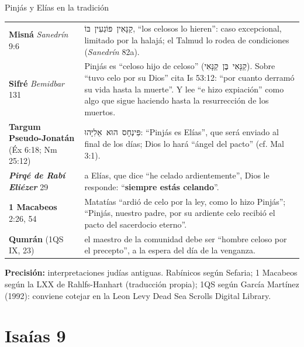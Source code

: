 \documentclass[hyperref={bookmarks=false},aspectratio=169]{beamer}
\newcommand{\heb}[1]{\mbox{\foreignlanguage{hebrew}{#1}}}
\newcommand{\destacar}[1]{\textbf{\textcolor{azul}{#1}}}
\newcommand{\precision}[1]{{\footnotesize\color{gris}\textbf{Precisión:} #1}}
\begin{document}
\begin{frame}{Pinjás y Elías en la tradición}
\scriptsize\renewcommand{\arraystretch}{1.16}
\begin{tabular}{@{}>{\RaggedRight\arraybackslash}p{3.0cm}>{\RaggedRight\arraybackslash}p{8.8cm}@{}}
\toprule
\textbf{Misná} \emph{Sanedrín} 9:6 & \heb{קַנָּאִין פּוֹגְעִין בּוֹ}, ``los celosos lo hieren'': caso excepcional, limitado por la halajá; el Talmud lo rodea de condiciones (\emph{Sanedrín} 82a). \\
\textbf{Sifré} \emph{Bemidbar} 131 & Pinjás es ``celoso hijo de celoso'' (\heb{קַנָּאִי בֶּן קַנָּאִי}). Sobre ``tuvo celo por su Dios'' cita Is 53:12: ``por cuanto derramó su vida hasta la muerte''. Y lee ``e hizo expiación'' como algo que sigue haciendo hasta la resurrección de los muertos. \\
\textbf{Targum Pseudo-Jonatán} (Éx 6:18; Nm 25:12) & \heb{פִּינְחָס הוּא אֵלִיָּהוּ}: ``Pinjás es Elías'', que será enviado al final de los días; Dios lo hará ``ángel del pacto'' (cf. Mal 3:1). \\
\textbf{\emph{Pirqé de Rabí Eliézer}} 29 & a Elías, que dice ``he celado ardientemente'', Dios le responde: ``\destacar{siempre estás celando}''. \\
\textbf{1 Macabeos} 2:26, 54 & Matatías ``ardió de celo por la ley, como lo hizo Pinjás''; ``Pinjás, nuestro padre, por su ardiente celo recibió el pacto del sacerdocio eterno''. \\
\textbf{Qumrán} (1QS IX, 23) & el maestro de la comunidad debe ser ``hombre celoso por el precepto'', a la espera del día de la venganza. \\
\bottomrule
\end{tabular}\par\smallskip
\precision{interpretaciones judías antiguas. Rabínicos según Sefaria; 1 Macabeos según la LXX de Rahlfs-Hanhart (traducción propia); 1QS según García Martínez (1992): conviene cotejar en la Leon Levy Dead Sea Scrolls Digital Library.}
\end{frame}

\section{Isaías 9}
\end{document}

